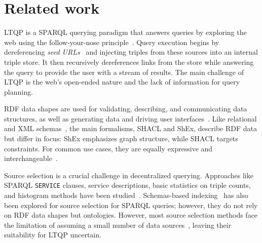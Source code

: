 \section{Related work}

LTQP is a SPARQL querying paradigm that answers queries by exploring the web using the follow-your-nose principle~\cite{hartig2016walking}.
Query execution begins by dereferencing \emph{seed URLs}~\cite{hartig2016walking} and injecting triples from these sources into an internal triple store.
It then recursively dereferences links from the store while answering the query to provide the user with a stream of results.
The main challenge of LTQP is the web's open-ended nature and the lack of information for query planning.

RDF data shapes are used for validating, describing, and communicating data structures, as well as generating data and driving user interfaces~\cite{Gayo2018a,Gayo2018}.
Like relational and XML schemas~\cite{Boneva2017}, the main formalisms, SHACL and ShEx, describe RDF data but differ in focus: ShEx emphasizes graph structure, while SHACL targets constraints.
For common use cases, they are equally expressive and interchangeable~\cite{Gayo2018c}.

Source selection is a crucial challenge in decentralized querying.
Approaches like SPARQL \texttt{SERVICE} clauses, service descriptions, basic statistics on triple counts, and histogram methods have been studied~\cite{hose2012towards, Harth2010}.
Schemas-based indexing~\cite{Stuckenschmidt2004} has also been explored for source selection for SPARQL queries; however, they do not rely on RDF data shapes but ontologies. 
However, most source selection methods face the limitation of assuming a small number of data sources~\cite{Harth2010}, leaving their suitability for LTQP uncertain.

